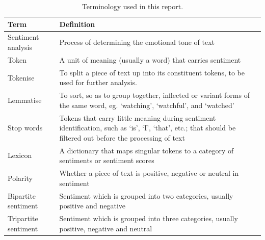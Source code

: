 \documentclass[12pt,bibliography=totocnumbered]{scrartcl}
\begin{document}
{%
\begin{table}[htpb] \caption{Terminology used in this report.}
	\label{tab:terms}
	\begin{center}
		\begin{tabular}[]{|p{}|p{}|}
			\hline
			\bf{Term}                        & \bf{Definition}                                                                                                                                              \\
			\hline
			Sentiment analysis               & Process of determining the emotional tone of text                                                                                                            \\
			\hline
			Token                            & A unit of meaning (usually a word) that carries sentiment                                                                                                    \\
			\hline
			Tokenise                         & To split a piece of text up into its constituent tokens, to be used for further analysis.                                                                    \\
			\hline
			Lemmatise                        & To sort, so as to group together, inflected or variant forms of the same word, eg. `watching', `watchful', and `watched'                                     \\
			\hline
			Stop words                       & Tokens that carry little meaning during sentiment identification, such as `is', `I', `that', etc.; that should be filtered out before the processing of text \\
			\hline
			Lexicon                          & A dictionary that maps singular tokens to a category of sentiments or sentiment scores                                                                       \\
			\hline
			Polarity                         & Whether a piece of text is positive, negative or neutral in sentiment                                                                                        \\
			\hline
			Bipartite sentiment              & Sentiment which is grouped into two categories, usually positive and negative                                                                                \\
			\hline
			Tripartite sentiment             & Sentiment which is grouped into three categories, usually positive, negative and neutral                                                                     \\

\end{tabular}
\end{center}
\end{table}}
\end{document}
